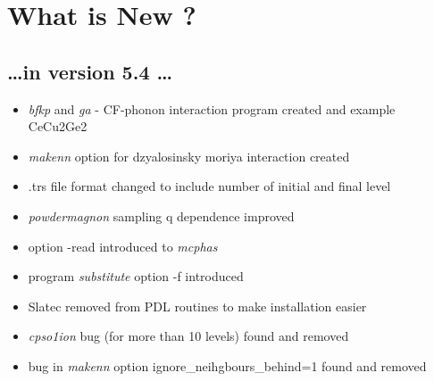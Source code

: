\documentclass[twoside]{article}
\newcommand{\prg}{\sl}
\begin{document}
\section*{What is New ?}
\subsection*{ \dots in version 5.4 \dots}
\begin{itemize}
\item    {\prg bfkp} and {\prg ga} - CF-phonon interaction program created and example CeCu2Ge2 
\item  {\prg makenn} option for dzyalosinsky moriya interaction created
\item .trs file format changed to include number of initial and final level
\item   {\prg powdermagnon} sampling q dependence improved
\item option -read introduced to {\prg mcphas}
\item   program {\prg substitute} option -f introduced
\item   Slatec removed from PDL routines to make installation easier
\item {\prg cpso1ion} bug (for more than 10 levels) found and removed
\item bug in {\prg makenn} option ignore\_neihgbours\_behind=1 found and removed
\end{itemize}
\end{document}
